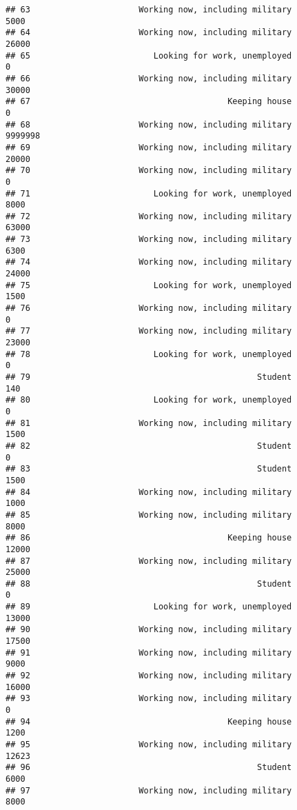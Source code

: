 \documentclass[]{book}
\theoremstyle{definition}
\theoremstyle{definition}
\theoremstyle{remark}
\begin{document}
\begin{verbatim}
## 63                      Working now, including military            5000
## 64                      Working now, including military           26000
## 65                         Looking for work, unemployed               0
## 66                      Working now, including military           30000
## 67                                        Keeping house               0
## 68                      Working now, including military         9999998
## 69                      Working now, including military           20000
## 70                      Working now, including military               0
## 71                         Looking for work, unemployed            8000
## 72                      Working now, including military           63000
## 73                      Working now, including military            6300
## 74                      Working now, including military           24000
## 75                         Looking for work, unemployed            1500
## 76                      Working now, including military               0
## 77                      Working now, including military           23000
## 78                         Looking for work, unemployed               0
## 79                                              Student             140
## 80                         Looking for work, unemployed               0
## 81                      Working now, including military            1500
## 82                                              Student               0
## 83                                              Student            1500
## 84                      Working now, including military            1000
## 85                      Working now, including military            8000
## 86                                        Keeping house           12000
## 87                      Working now, including military           25000
## 88                                              Student               0
## 89                         Looking for work, unemployed           13000
## 90                      Working now, including military           17500
## 91                      Working now, including military            9000
## 92                      Working now, including military           16000
## 93                      Working now, including military               0
## 94                                        Keeping house            1200
## 95                      Working now, including military           12623
## 96                                              Student            6000
## 97                      Working now, including military            8000

\end{verbatim}
\end{document}
